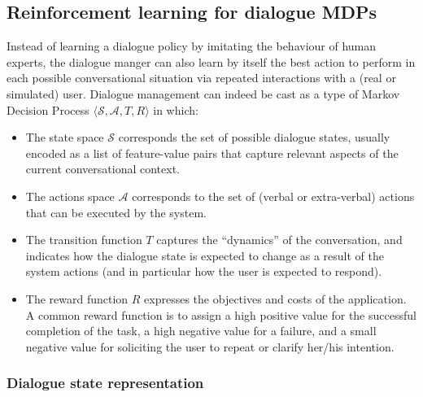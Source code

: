 
\subsection{Reinforcement learning for dialogue MDPs}

Instead of learning a dialogue policy by imitating the behaviour of human experts, the dialogue manger can also learn by itself the best action to perform in each possible conversational situation via repeated interactions with a (real or simulated) user.  Dialogue management can indeed be cast as a type of Markov Decision Process $\langle \mathcal{S}, \mathcal{A}, T, R \rangle$ in which: 
\begin{itemize}
\item The state space $\mathcal{S}$ corresponds the set of possible dialogue states, usually encoded as a list of feature-value pairs that capture relevant aspects of the current conversational context.
\item The actions space $\mathcal{A}$ corresponds to the set of (verbal or extra-verbal) actions that can be executed by the system.
\item The transition function $T$ captures the ``dynamics'' of the conversation, and indicates how the dialogue state is expected to change as a result of the system actions (and in particular how the user is expected to respond). 
\item The reward function $R$ expresses the objectives and costs of the application. A common reward function is to assign a high positive value for the successful completion of the task, a high negative value for a failure, and a small negative value for soliciting the user to repeat or clarify her/his intention.  
\end{itemize}

\subsubsection*{Dialogue state representation}

